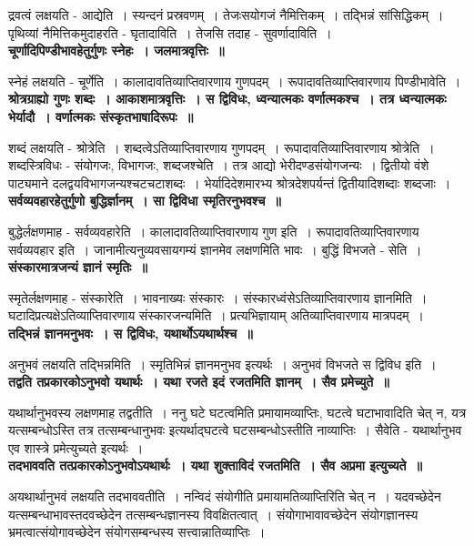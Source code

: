 		द्रवत्वं लक्षयति - आद्येति~। स्यन्दनं प्रस्रवणम्~। तेजःसयोगजं नैमित्तिकम्~। तद्भिन्नं सांसिद्धिकम्~। पृथिव्यां नैमित्तिकमुदाहरति - घृतादाविति~। तेजसि तदाह - सुवर्णादाविति~।\\[10pt]
	{\bfseries चूर्णादिपिण्डीभावहेतुर्गुणः स्नेहः~। जलमात्रवृत्तिः~॥}\par
		स्नेहं लक्षयति - चूर्णेति~। कालादावतिव्याप्तिवारणाय गुणपदम्~। रूपादावतिव्याप्तिवारणाय पिण्डीभावेति~।\\[10pt]
	{\bfseries श्रोत्रग्राह्यो गुणः शब्दः~। आकाशमात्रवृत्तिः~। स द्विविधः, ध्वन्यात्मकः वर्णात्मकश्च~। तत्र ध्वन्यात्मकः भेर्यादौ~। वर्णात्मकः संस्कृतभाषादिरूपः~॥}\par
		शब्दं लक्षयति - श्रोत्रेति~। शब्दत्वेऽतिव्याप्तिवारणाय गुणपदम्~। रूपादावतिव्याप्तिवारणाय श्रोत्रेति~। शब्दस्त्रिविधः - संयोगजः, विभागजः, शब्दजश्चेति~। तत्र आद्यो भेरीदण्डसंयोगजन्यः~। द्वितीयो वंशे पाट्यमाने दलद्वयविभागजन्यश्चटचटाशब्दः~। भेर्यादिदेशमारभ्य श्रोत्रदेशपर्यन्तं द्वितीयादिशब्दाः शब्दजाः~।\\[10pt]
	{\bfseries सर्वव्यवहारहेतुर्गुणो बुद्धिर्ज्ञानम्~। सा द्विविधा स्मृतिरनुभवश्च~॥}\par
		बुद्धेर्लक्षणमाह - सर्वव्यवहारेति~। कालादावतिव्याप्तिवारणाय गुण इति~। रूपादावतिव्याप्तिवारणाय सर्वव्यवहार इति~। जानामीत्यनुव्यवसायगम्यं ज्ञानमेव लक्षणमिति भावः~। बुद्धिं विभजते - सेति~।\\[10pt]
	{\bfseries संस्कारमात्रजन्यं ज्ञानं स्मृतिः~॥}\par
		स्मृतेर्लक्षणमाह - संस्कारेति~। भावनाख्यः संस्कारः~। संस्कारध्वंसेऽतिव्याप्तिवारणाय ज्ञानमिति~। घटादिप्रत्यक्षेऽतिव्याप्तिवारणाय संस्कारजन्यमिति~। प्रत्यभिज्ञायाम् अतिव्याप्तिवारणाय मात्रपदम्~।\\[10pt]
	{\bfseries तद्भिन्नं ज्ञानमनुभवः~। स द्विविधः, यथार्थोऽयथार्थश्च~॥}\par
		अनुभवं लक्षयति तद्भिन्नमिति~। स्मृतिभिन्नं ज्ञानमनुभव इत्यर्थः~। अनुभवं विभजते स द्विविध इति~।\\[10pt]
	{\bfseries तद्वति तप्रकारकोऽनुभवो यथार्थः~। यथा रजते इदं रजतमिति ज्ञानम्~। सैव प्रमेच्युते~॥}\par
		यथार्थानुभवस्य लक्षणमाह तद्वतीति~। ननु घटे घटत्वमिति प्रमायामव्याप्तिः, घटत्वे घटाभावादिति चेत् न, यत्र यत्सम्बन्धोऽस्ति तत्र तत्सम्बन्धानुभवः इत्यर्थाद्घटत्वे घटसम्बन्धोऽस्तीति नाव्याप्तिः~। सैवेति - यथार्थानुभव एव शास्त्रे प्रमेत्युच्यते इत्यर्थः~।\\[10pt]
	{\bfseries तदभाववति तत्प्रकारकोऽनुभवोऽयथार्थः~। यथा शुक्ताविदं रजतमिति~। सैव अप्रमा इत्युच्यते~॥}\par
		अयथार्थानुभवं लक्षयति तदभाववतीति~। नन्विदं संयोगीति प्रमायामतिव्याप्तिरिति चेत् न~। यदवच्छेदेन यत्सम्बन्धाभावस्तदवच्छेदेन तत्सम्बन्धज्ञानस्य विवक्षितत्वात्~। संयोगाभावावच्छेदेन संयोगज्ञानस्य भ्रमत्वात्संयोगावच्छेदेन संयोगसम्बन्धस्य सत्त्वान्नातिव्याप्तिः~।\\[10pt]
